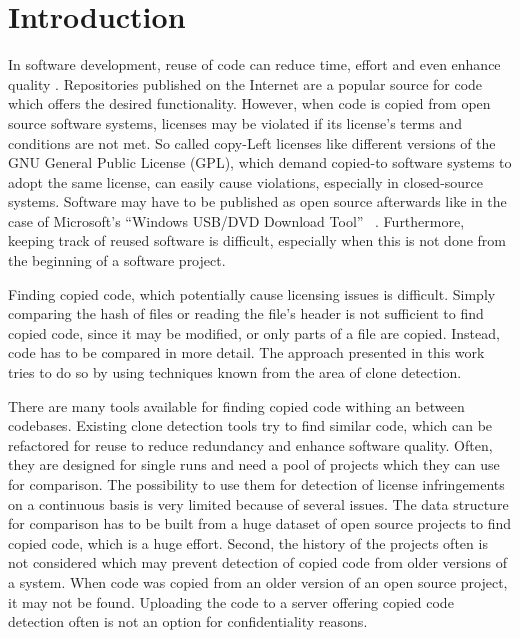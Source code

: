
\chapter{Introduction}\label{chapter:introduction}
In software development, reuse of code can reduce time, effort and even enhance quality \cite{krueger1992software}.
Repositories published on the Internet are a popular source for code which offers the desired functionality.
However, when code is copied from open source software systems, licenses may be violated if its license's terms and conditions are not met.
So called copy-Left licenses like different versions of the GNU General Public License (GPL), which demand copied-to software systems to adopt the same license, can easily cause violations, especially in closed-source systems.
Software may have to be published as open source afterwards like in the case of Microsoft's ``Windows USB/DVD Download Tool'' \ \cite{microsoft2009download}.
Furthermore, keeping track of reused software is difficult, especially when this is not done from the beginning of a software project.

Finding copied code, which potentially cause licensing issues is difficult.
Simply comparing the hash of files or reading the file's header is not sufficient to find copied code, since it may be modified, or only parts of a file are copied.
Instead, code has to be compared in more detail.
The approach presented in this work tries to do so by using techniques known from the area of clone detection.

There are many tools available for finding copied code withing an between codebases.
Existing clone detection tools try to find similar code, which can be refactored for reuse to reduce redundancy and enhance software quality.
Often, they are designed for single runs and need a pool of projects which they can use for comparison.
The possibility to use them for detection of license infringements on a continuous basis is very limited because of several issues.
The data structure for comparison has to be built from a huge dataset of open source projects to find copied code, which is a huge effort.
Second, the history of the projects often is not considered which may prevent detection of copied code from older versions of a system.
When code was copied from an older version of an open source project, it may not be found.
Uploading the code to a server offering copied code detection often is not an option for confidentiality reasons.

